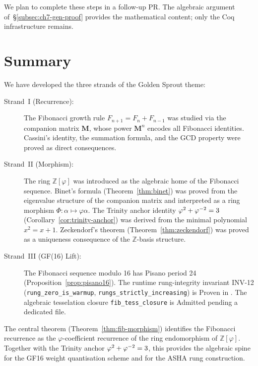 We plan to complete these steps in a follow-up PR.  The algebraic
argument of~\S\ref{subsec:ch7-gen-proof} provides the mathematical
content; only the Coq infrastructure remains.

\section{Summary}\label{sec:ch7-summary}

We have developed the three strands of the Golden Sprout theme:

\begin{description}
  \item[Strand~I (Recurrence):] The Fibonacci growth rule
    \(F_{n+1} = F_n + F_{n-1}\) was studied via the companion matrix
    \(\mathbf{M}\), whose power \(\mathbf{M}^n\) encodes all Fibonacci
    identities.  Cassini's identity, the summation formula, and the GCD
    property were proved as direct consequences.

  \item[Strand~II (Morphism):] The ring \(\mathbb{Z}[\varphi]\) was
    introduced as the algebraic home of the Fibonacci sequence.
    Binet's formula (Theorem~\ref{thm:binet}) was proved from the
    eigenvalue structure of the companion matrix and interpreted as a
    ring morphism \(\Phi : \alpha \mapsto \varphi\alpha\).  The Trinity
    anchor identity \(\varphi^{2}+\varphi^{-2}=3\)
    (Corollary~\ref{cor:trinity-anchor}) was derived from the minimal
    polynomial \(x^2 = x+1\).
    Zeckendorf's theorem (Theorem~\ref{thm:zeckendorf}) was proved as a
    uniqueness consequence of the \(\mathbb{Z}\)-basis structure.

  \item[Strand~III (GF(16) Lift):] The Fibonacci sequence modulo 16 has
    Pisano period 24 (Proposition~\ref{prop:pisano16}).  The runtime
    rung-integrity invariant INV-12 (\texttt{rung\_zero\_is\_warmup},
    \texttt{rungs\_strictly\_increasing}) is Proven in
    .
    The algebraic tesselation closure \texttt{fib\_tess\_closure} is
    Admitted pending a dedicated  file.
\end{description}

The central theorem (Theorem~\ref{thm:fib-morphism}) identifies the
Fibonacci recurrence as the \(\varphi\)-coefficient recurrence of the ring
endomorphism of \(\mathbb{Z}[\varphi]\).  Together with the Trinity anchor
\(\varphi^{2}+\varphi^{-2}=3\), this provides the algebraic spine for the
GF16 weight quantisation scheme and for the ASHA rung construction.

